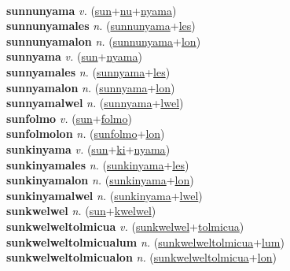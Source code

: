  \label{sunak} \\
\textbf{sunnunyama} \textit{v.} (\hyperref[sun]{sun}+\hyperref[nu]{nu}+\hyperref[nyama]{nyama})
 \label{sunnunyama} \\
\textbf{sunnunyamales} \textit{n.} (\hyperref[sunnunyama]{sunnunyama}+\hyperref[les]{les})
 \label{sunnunyamales} \\
\textbf{sunnunyamalon} \textit{n.} (\hyperref[sunnunyama]{sunnunyama}+\hyperref[lon]{lon})
 \label{sunnunyamalon} \\
\textbf{sunnyama} \textit{v.} (\hyperref[sun]{sun}+\hyperref[nyama]{nyama})
 \label{sunnyama} \\
\textbf{sunnyamales} \textit{n.} (\hyperref[sunnyama]{sunnyama}+\hyperref[les]{les})
 \label{sunnyamales} \\
\textbf{sunnyamalon} \textit{n.} (\hyperref[sunnyama]{sunnyama}+\hyperref[lon]{lon})
 \label{sunnyamalon} \\
\textbf{sunnyamalwel} \textit{n.} (\hyperref[sunnyama]{sunnyama}+\hyperref[lwel]{lwel})
 \label{sunnyamalwel} \\
\textbf{sunfolmo} \textit{v.} (\hyperref[sun]{sun}+\hyperref[folmo]{folmo})
 \label{sunfolmo} \\
\textbf{sunfolmolon} \textit{n.} (\hyperref[sunfolmo]{sunfolmo}+\hyperref[lon]{lon})
 \label{sunfolmolon} \\
\textbf{sunkinyama} \textit{v.} (\hyperref[sun]{sun}+\hyperref[ki]{ki}+\hyperref[nyama]{nyama})
 \label{sunkinyama} \\
\textbf{sunkinyamales} \textit{n.} (\hyperref[sunkinyama]{sunkinyama}+\hyperref[les]{les})
 \label{sunkinyamales} \\
\textbf{sunkinyamalon} \textit{n.} (\hyperref[sunkinyama]{sunkinyama}+\hyperref[lon]{lon})
 \label{sunkinyamalon} \\
\textbf{sunkinyamalwel} \textit{n.} (\hyperref[sunkinyama]{sunkinyama}+\hyperref[lwel]{lwel})
 \label{sunkinyamalwel} \\
\textbf{sunkwelwel} \textit{n.} (\hyperref[sun]{sun}+\hyperref[kwelwel]{kwelwel})
 \label{sunkwelwel} \\
\textbf{sunkwelweltolmicua} \textit{v.} (\hyperref[sunkwelwel]{sunkwelwel}+\hyperref[tolmicua]{tolmicua})
 \label{sunkwelweltolmicua} \\
\textbf{sunkwelweltolmicualum} \textit{n.} (\hyperref[sunkwelweltolmicua]{sunkwelweltolmicua}+\hyperref[lum]{lum})
 \label{sunkwelweltolmicualum} \\
\textbf{sunkwelweltolmicualon} \textit{n.} (\hyperref[sunkwelweltolmicua]{sunkwelweltolmicua}+\hyperref[lon]{lon})
